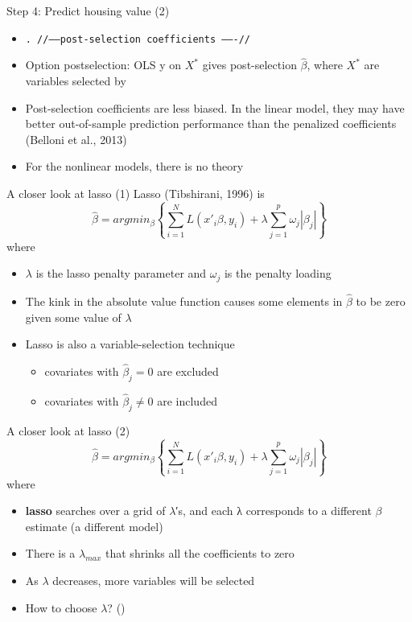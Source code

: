 \documentclass{beamer}
\begin{document}
\begin{frame}{Step 4: Predict housing value (2)}
	\label{post-selection}
	\begin{itemize}
		\item [] \small{\texttt{. //------post-selection coefficients -------//}}
	\end{itemize}
	\begin{itemize}
		\item Option postselection: OLS y on $X^\ast$ gives post-selection $\hat{\beta}$, where $X^*$ are variables selected by \hyperlink{lasso}{}
		\item Post-selection coefficients are less biased. In the linear model, they may have better out-of-sample prediction performance than the penalized coefficients (Belloni et al., 2013)
		\item For the nonlinear models, there is no theory
	\end{itemize}
\end{frame}

\begin{frame}{A closer look at lasso (1)}
Lasso (Tibshirani, 1996) is
$$\hat{\beta}=argmin_\beta\left\lbrace \sum_{i=1}^{N}L(x'_i\beta,y_i)+\lambda\sum_{j=1}^{p}\omega_j|\beta_j|\right\rbrace $$
where
	\begin{itemize}
		\item $\lambda$ is the lasso penalty parameter and $\omega_j$ is the penalty loading
		\item The kink in the absolute value function causes some elements in $\hat{\beta}$ to be zero given some value of $\lambda$
		\item Lasso is also a variable-selection technique
		\begin{itemize}
			\item covariates with $\hat{\beta}_j=0$ are excluded
			\item covariates with $\hat{\beta}_j\neq0$ are included
		\end{itemize}
	\end{itemize}
\end{frame}

\begin{frame}{A closer look at lasso (2)}
	$$\hat{\beta}=argmin_\beta\left\lbrace \sum_{i=1}^{N}L(x'_i\beta,y_i)+\lambda\sum_{j=1}^{p}\omega_j|\beta_j|\right\rbrace $$
	where
	\begin{itemize}
		\item \textbf{lasso} searches over a grid of $\lambda$′s, and each λ corresponds to a different $\beta$ estimate (a different model)
		\item There is a $\lambda_{max}$ that shrinks all the coefficients to zero
		\item As $\lambda$ decreases, more variables will be selected
		\item How to choose $\lambda$? (\hyperlink{choose}{})
	\end{itemize}
\end{frame}
\end{document}
